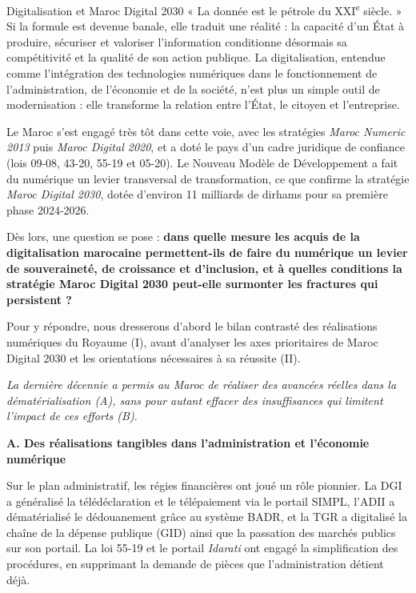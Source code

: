 \begin{copiemodele}{Digitalisation et Maroc Digital 2030}
« La donnée est le pétrole du XXI\textsuperscript{e} siècle. » Si la formule est devenue banale, elle traduit une réalité : la capacité d'un État à produire, sécuriser et valoriser l'information conditionne désormais sa compétitivité et la qualité de son action publique. La digitalisation, entendue comme l'intégration des technologies numériques dans le fonctionnement de l'administration, de l'économie et de la société, n'est plus un simple outil de modernisation : elle transforme la relation entre l'État, le citoyen et l'entreprise.

Le Maroc s'est engagé très tôt dans cette voie, avec les stratégies \textit{Maroc Numeric 2013} puis \textit{Maroc Digital 2020}, et a doté le pays d'un cadre juridique de confiance (lois 09-08, 43-20, 55-19 et 05-20). Le Nouveau Modèle de Développement a fait du numérique un levier transversal de transformation, ce que confirme la stratégie \textit{Maroc Digital 2030}, dotée d'environ 11 milliards de dirhams pour sa première phase 2024-2026.

Dès lors, une question se pose : \textbf{dans quelle mesure les acquis de la digitalisation marocaine permettent-ils de faire du numérique un levier de souveraineté, de croissance et d'inclusion, et à quelles conditions la stratégie Maroc Digital 2030 peut-elle surmonter les fractures qui persistent ?}

Pour y répondre, nous dresserons d'abord le bilan contrasté des réalisations numériques du Royaume (I), avant d'analyser les axes prioritaires de Maroc Digital 2030 et les orientations nécessaires à sa réussite (II).

\textit{La dernière décennie a permis au Maroc de réaliser des avancées réelles dans la dématérialisation (A), sans pour autant effacer des insuffisances qui limitent l'impact de ces efforts (B).}

\textbf{A. Des réalisations tangibles dans l'administration et l'économie numérique}

Sur le plan administratif, les régies financières ont joué un rôle pionnier. La DGI a généralisé la télédéclaration et le télépaiement via le portail SIMPL, l'ADII a dématérialisé le dédouanement grâce au système BADR, et la TGR a digitalisé la chaîne de la dépense publique (GID) ainsi que la passation des marchés publics sur son portail. La loi 55-19 et le portail \textit{Idarati} ont engagé la simplification des procédures, en supprimant la demande de pièces que l'administration détient déjà.


\end{copiemodele}
